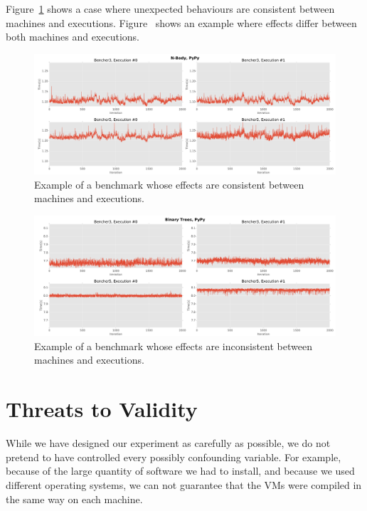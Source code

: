 \documentclass[10pt,preprint]{sigplanconf}
\begin{document}

Figure~\ref{fig:examples:consistent_weirdness1} shows a case where
unexpected behaviours are consistent between machines and executions.
Figure~\label{fig:examples:inconsistent_weirdness1} shows an example where
effects differ between both machines and executions.

\begin{figure}[h!]
\centering
\includegraphics[width=\textwidth]{examples/consistent_weirdness1}
\caption{Example of a benchmark whose effects are consistent between machines and executions.}
\label{fig:examples:consistent_weirdness1}
\end{figure}

\begin{figure}[h!]
\centering
\includegraphics[width=\textwidth]{examples/inconsistent_weirdness1}
\caption{Example of a benchmark whose effects are inconsistent between machines and executions.}
\label{fig:examples:inconsistent_weirdness1}
\end{figure}


\section{Threats to Validity}
\label{sec:threats}

While we have designed our experiment as carefully as possible, we do not
pretend to have controlled every possibly confounding variable. For example,
because of the large quantity of software we had to install, and because we used
different operating systems, we can not guarantee that the VMs were compiled in
the same way on each machine. 
\end{document}
